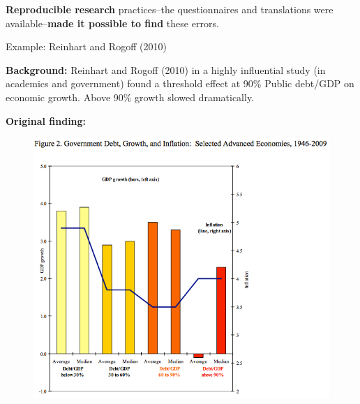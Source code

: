 \documentclass[10pt]{beamer}
\begin{document}
\begin{frame}

    \begin{center}
        \textbf{Reproducible research} practices--the questionnaires and translations were available--\textbf{made it possible to find} these errors.
    \end{center}

\end{frame}

\begin{frame}{Example: Reinhart and Rogoff (2010)}

    \textbf{Background:} Reinhart and Rogoff (2010) in a highly influential study (in academics and government) found a threshold effect at 90\% Public debt/GDP on economic growth. Above 90\% growth slowed dramatically.

    \textbf{Original finding:}

    \begin{figure}
        \includegraphics[scale=0.3]{img/rr_original.png}
    \end{figure}


\end{frame}
\end{document}
